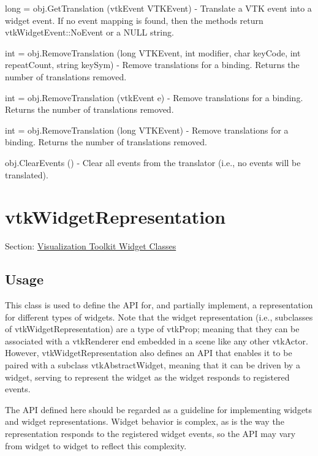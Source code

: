 \begin{DoxyItemize}
\item {\ttfamily long = obj.\-Get\-Translation (vtk\-Event V\-T\-K\-Event)} -\/ Translate a V\-T\-K event into a widget event. If no event mapping is found, then the methods return vtk\-Widget\-Event\-::\-No\-Event or a N\-U\-L\-L string.  
\item {\ttfamily int = obj.\-Remove\-Translation (long V\-T\-K\-Event, int modifier, char key\-Code, int repeat\-Count, string key\-Sym)} -\/ Remove translations for a binding. Returns the number of translations removed.  
\item {\ttfamily int = obj.\-Remove\-Translation (vtk\-Event e)} -\/ Remove translations for a binding. Returns the number of translations removed.  
\item {\ttfamily int = obj.\-Remove\-Translation (long V\-T\-K\-Event)} -\/ Remove translations for a binding. Returns the number of translations removed.  
\item {\ttfamily obj.\-Clear\-Events ()} -\/ Clear all events from the translator (i.\-e., no events will be translated).  
\end{DoxyItemize}\hypertarget{vtkwidgets_vtkwidgetrepresentation}{}\section{vtk\-Widget\-Representation}\label{vtkwidgets_vtkwidgetrepresentation}
Section\-: \hyperlink{sec_vtkwidgets}{Visualization Toolkit Widget Classes} \hypertarget{vtkwidgets_vtkxyplotwidget_Usage}{}\subsection{Usage}\label{vtkwidgets_vtkxyplotwidget_Usage}
This class is used to define the A\-P\-I for, and partially implement, a representation for different types of widgets. Note that the widget representation (i.\-e., subclasses of vtk\-Widget\-Representation) are a type of vtk\-Prop; meaning that they can be associated with a vtk\-Renderer end embedded in a scene like any other vtk\-Actor. However, vtk\-Widget\-Representation also defines an A\-P\-I that enables it to be paired with a subclass vtk\-Abstract\-Widget, meaning that it can be driven by a widget, serving to represent the widget as the widget responds to registered events.

The A\-P\-I defined here should be regarded as a guideline for implementing widgets and widget representations. Widget behavior is complex, as is the way the representation responds to the registered widget events, so the A\-P\-I may vary from widget to widget to reflect this complexity.

